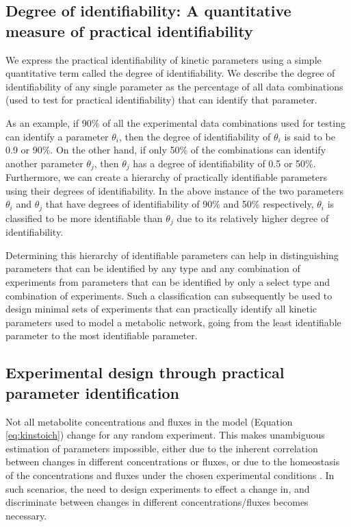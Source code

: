 \documentclass[10pt]{article}
\begin{document}
	\subsection{Degree of identifiability: A quantitative measure of practical identifiability}\label{sec:degree_of_identifiability}
	We express the practical identifiability of kinetic parameters using a simple quantitative term called the degree of identifiability. We describe the degree of identifiability of any single parameter as the percentage of all data combinations (used to test for practical identifiability) that can identify that parameter. 
	
	As an example, if 90\% of all the experimental data combinations used for testing can identify a parameter $\theta_i$, then the degree of identifiability of $\theta_i$ is said to be 0.9 or 90\%. On the other hand, if only 50\% of the combinations can identify another parameter $\theta_j$, then $\theta_j$ has a degree of identifiability of 0.5 or 50\%. Furthermore, we can create a hierarchy of practically identifiable parameters using their degrees of identifiability. In the above instance of the two parameters $\theta_i$ and $\theta_j$ that have degrees of identifiability of 90\% and 50\% respectively, $\theta_i$ is classified to be more identifiable than $\theta_j$ due to its relatively higher degree of identifiability. 
	
	Determining this hierarchy of identifiable parameters can help in distinguishing parameters that can be identified by any type and any combination of experiments from parameters that can be identified by only a select type and combination of experiments. Such a classification can subsequently be used to design minimal sets of experiments that can practically identify all kinetic parameters used to model a metabolic network, going from the least identifiable parameter to the most identifiable parameter.  	
		
	\subsection{Experimental design through practical parameter identification}\label{sec:experimental_design}		
	Not all metabolite concentrations and fluxes in the model (Equation \ref{eq:kinstoich}) change for any random experiment. This makes unambiguous estimation of parameters impossible, either due to the inherent correlation between changes in different concentrations or fluxes, or due to the homeostasis of the concentrations and fluxes under the chosen experimental conditions \parencite{Heijnen2013}. In such scenarios, the need to design experiments to effect a change in, and discriminate between changes in different concentrations/fluxes becomes necessary. 
		
\end{document}
